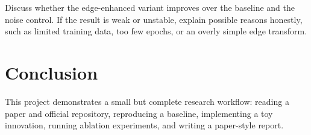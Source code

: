 \documentclass[10pt,conference]{IEEEtran}
\begin{document}
Discuss whether the edge-enhanced variant improves over the baseline and the noise control. If the result is weak or unstable, explain possible reasons honestly, such as limited training data, too few epochs, or an overly simple edge transform.

\section{Conclusion}

This project demonstrates a small but complete research workflow: reading a paper and official repository, reproducing a baseline, implementing a toy innovation, running ablation experiments, and writing a paper-style report.



\end{document}
